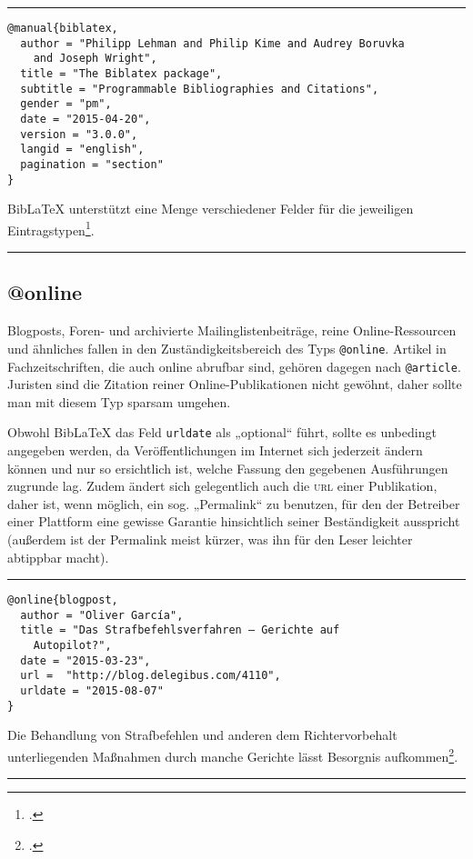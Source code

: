\documentclass[11pt,a4paper,DIV=calc,draft]{scrartcl}
\newcommand\software[1]{\textsf{#1}}
\newcommand\Biblatex{\software{Bib\LaTeX{}}\xspace}
\newcommand\abbrev[1]{\textsc{#1}}
\newenvironment{rubexample}{\par\vspace{\baselineskip}\hrule\par\begin{refsection}}{\end{refsection}\par\hrule\par\vspace{\baselineskip}}
\begin{document}
\begin{rubexample}
\begin{verbatim}
@manual{biblatex,
  author = "Philipp Lehman and Philip Kime and Audrey Boruvka
    and Joseph Wright",
  title = "The Biblatex package",
  subtitle = "Programmable Bibliographies and Citations",
  gender = "pm",
  date = "2015-04-20",
  version = "3.0.0",
  langid = "english",
  pagination = "section"
}
\end{verbatim}

\Biblatex unterstützt eine Menge verschiedener Felder für die
jeweiligen Eintragstypen\footcite[2.2.2]{biblatex}.

\printbibliography
\end{rubexample}

\subsection{@online}

Blogposts, Foren- und archivierte Mailinglistenbeiträge, reine
On\-line-Res\-sour\-cen und ähnliches fallen in den
Zuständigkeitsbereich des Typs \verb+@online+. Artikel in
Fachzeitschriften, die auch online abrufbar sind, gehören dagegen nach
\verb+@article+. Juristen sind die Zitation reiner
On\-line-Pu\-bli\-ka\-tio\-nen nicht gewöhnt, daher sollte man mit
diesem Typ sparsam umgehen.

Obwohl \Biblatex das Feld \verb+urldate+ als „optional“ führt, sollte
es unbedingt angegeben werden, da Veröffentlichungen im Internet sich
jederzeit ändern können und nur so ersichtlich ist, welche Fassung den
gegebenen Ausführungen zugrunde lag. Zudem ändert sich gelegentlich
auch die \abbrev{url} einer Publikation, daher ist, wenn möglich, ein
sog. „Permalink“ zu benutzen, für den der Betreiber einer Plattform
eine gewisse Garantie hinsichtlich seiner Beständigkeit ausspricht
(außerdem ist der Permalink meist kürzer, was ihn für den Leser
leichter abtippbar macht).

\begin{rubexample}
\begin{verbatim}
@online{blogpost,
  author = "Oliver García",
  title = "Das Strafbefehlsverfahren — Gerichte auf
    Autopilot?",
  date = "2015-03-23",
  url =  "http://blog.delegibus.com/4110",
  urldate = "2015-08-07"
}
\end{verbatim}

Die Behandlung von Strafbefehlen und anderen dem Richtervorbehalt
unterliegenden Maßnahmen durch manche Gerichte lässt Besorgnis
aufkommen\footcite{blogpost}.

\printbibliography
\end{rubexample}
\end{document}
